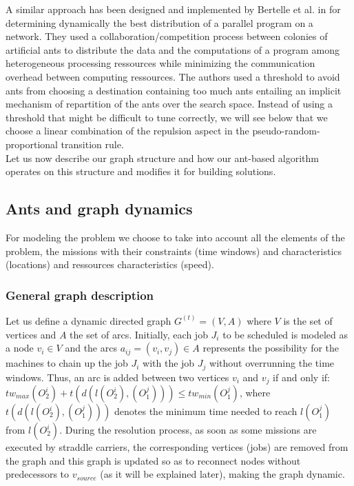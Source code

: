 \documentclass[review]{elsarticle}
\begin{document}
A similar approach has been designed and implemented by Bertelle et al. in \cite{Bertelle2006,Bertelle2007} for determining dynamically the best distribution of a parallel program on a network. They used a collaboration/competition process between colonies of artificial ants to distribute the data and the computations of a program among heterogeneous processing ressources while minimizing the communication overhead between computing ressources. The authors used a threshold to avoid ants from choosing a destination containing too much ants entailing an implicit mechanism of repartition of the ants over the search space. Instead of using a threshold that might be difficult to tune correctly, we will see below that we choose a linear combination of the repulsion aspect in the pseudo-random-proportional transition rule.\\

Let us now describe our graph structure and how our ant-based algorithm operates on this structure and modifies it for building solutions.

\subsection{Ants and graph dynamics}

For modeling the problem we choose to take into account all the elements of the problem, the missions with their constraints (time windows) and characteristics (locations) and ressources characteristics (speed).
 
\subsubsection{General graph description} 

Let us define a dynamic directed graph $G^{(t)} = (V,A)$ where $V$ is the set of vertices and $A$ the set of arcs. Initially, each job $J_i$ to be scheduled is modeled as a node $v_i \in V$ and the arcs $a_{ij} = (v_i,v_j) \in A$ represents the possibility for the machines to chain up the job $J_i$ with the job $J_j$ without overrunning the time windows. Thus, an arc is added between two vertices $v_i$ and $v_j$ if and only if:  $tw_{max}(O_2^i) + t(d(l(O_2^i),(O_1^j))) \leq tw_{min}(O_1^j)$, where $t(d(l(O_2^i),(O_1^j)))$ denotes the minimum time needed to reach $l(O_1^j)$ from $l(O_2^i)$. During the resolution process, as soon as some missions are executed by straddle carriers, the corresponding vertices (jobs) are removed from the graph and this graph is updated so as to reconnect nodes without predecessors to $v_{source}$ (as it will be explained later), making the graph dynamic.
\end{document}
